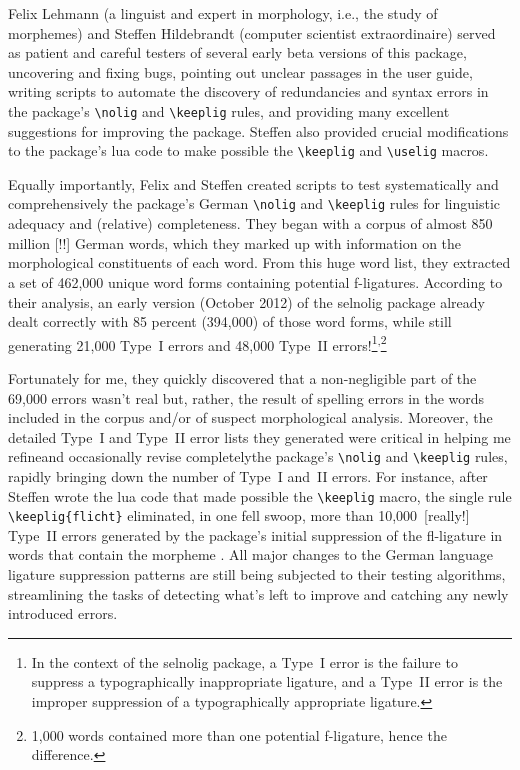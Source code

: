 \documentclass[11pt]{article}
\newcommand{\pkg}[1]{\textsf{#1}}
\newcommand{\opt}[1]{\uselig{\texttt{#1}}}
\newcommand{\cmmd}[1]{\texttt{\textbackslash #1}}
\begin{document}
Felix Lehmann (a linguist and expert in morphology, i.e., the study of morphemes) and Steffen Hildebrandt (computer scientist extraordinaire) served as patient and careful testers of several early beta versions of this package, uncovering and fixing bugs, pointing out unclear passages in the user guide, writing scripts to automate the discovery of redundancies and syntax errors in the package's \cmmd{nolig} and \cmmd{keeplig} rules, and providing many excellent suggestions for improving the package. Steffen also provided crucial modifications to the package's lua code to make possible the \cmmd{keeplig} and \cmmd{uselig} macros.

Equally importantly, Felix and Steffen created scripts to test systematically and comprehensively the package's German \cmmd{nolig} and \cmmd{keeplig} rules for linguistic adequacy and (relative) completeness.
They began with a corpus of almost 850 million [!!] German words, which they marked up with information on the morphological constituents of each word. From this huge word list, they extracted a set of 462,000 unique word forms containing potential f-ligatures.
According to their analysis, an early version (October 2012) of the \pkg{selnolig} package already dealt correctly with 85 percent (394,000) of those word forms, while still generating 21,000 Type~I errors and 48,000 Type~II errors!\footnote{In the context of the \pkg{selnolig} package, a Type~I error is the failure to suppress a typographically inappropriate ligature, and a Type~II error is the improper suppression of a typographically appropriate ligature.}\textsuperscript{,}\footnote{1,000 words contained more than one potential f-ligature, hence the difference.} 

\enlargethispage{0.3\baselineskip}

Fortunately for me, they quickly discovered that a non-negligible part of the 69,000 errors wasn't real but, rather, the result of spelling errors in the words included in the corpus and/or of suspect morphological analysis. Moreover, the detailed Type~I and Type~II error lists they generated were critical in helping me refine\textemdash and occasionally revise completely\textemdash the package's \cmmd{nolig} and \cmmd{keeplig} rules, rapidly bringing down the number of Type~I and~II errors. For instance, after Steffen wrote the lua code that made possible the \cmmd{keeplig} macro, the single rule \Verb+\keeplig{flicht}+ eliminated, in one fell swoop, more than 10,000~[really!] Type~II errors generated by the package's initial suppression of the fl-ligature in words that contain the morpheme \opt{pflicht}. All major changes to the German language ligature suppression patterns are still being subjected to their testing algorithms, streamlining the tasks of detecting what's left to improve and catching any newly introduced errors.
\end{document}

